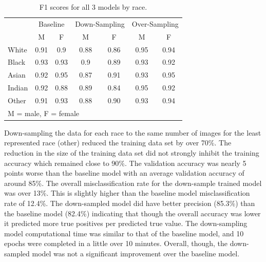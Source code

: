 \documentclass[obeyspaces, spaces, fleqn,10pt]{SelfArx} %
\begin{document}
\begin{table}[hbt]
\caption{F1 scores for all 3 models by race.}
\centering
\begin{tabular}{lcccccc}
\toprule
& \multicolumn{2}{c}{Baseline} & \multicolumn{2}{c}{Down-Sampling} & \multicolumn{2}{c}{Over-Sampling}\\
\cmidrule(r){1-7}
 & M & F & M & F & M & F \\
\midrule
White & 0.91 & 0.9 & 0.88 & 0.86 & 0.95 & 0.94\\
Black & 0.93 & 0.93 & 0.9 & 0.89 & 0.93 & 0.92\\
Asian & 0.92 & 0.95 & 0.87 & 0.91 & 0.93 & 0.95 \\
Indian & 0.92 & 0.88 & 0.89 & 0.84 & 0.95 & 0.92 \\
Other & 0.91 & 0.93 & 0.88 & 0.90 & 0.93 & 0.94 \\
\bottomrule
\multicolumn{7}{l}{M = male, F = female}
\end{tabular}
\label{tab:tab3}
\end{table}

Down-sampling the data for each race to the same number of images for the least represented race (other) reduced the training data set by over 70\%. The reduction in the size of the training data set did not strongly inhibit the training accuracy which remained close to 90\%. The validation accuracy was nearly 5 points worse than the baseline model with an average validation accuracy of around 85\%. The overall misclassification rate for the down-sample trained model was over 13\%. This is slightly higher than the baseline model misclassification rate of 12.4\%. The down-sampled model did have better precision (85.3\%) than the baseline model (82.4\%) indicating that though the overall accuracy was lower it predicted more true positives per predicted true value. The down-sampling model computational time was similar to that of the baseline model, and 10 epochs were completed in a little over 10 minutes. Overall, though, the down-sampled model was not a significant improvement over the baseline model.
\end{document}
